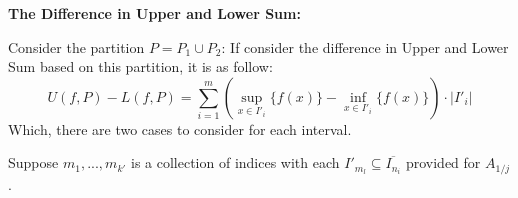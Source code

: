 \documentclass{article}
\begin{document}
\begin{itemize}
    \hfill

    \textbf{The Difference in Upper and Lower Sum:}

    Consider the partition $P=P_1\cup P_2$: If consider the difference in Upper and Lower Sum based on this partition, it is as follow:
    $$U(f,P)-L(f,P)=\sum_{i=1}^{m}\left(\sup_{x\in I'_i}\{f(x)\}-\inf_{x\in I'_i}\{f(x)\}\right)\cdot |I'_i|$$
    Which, there are two cases to consider for each interval.

    \hfill

    Suppose $m_1,...,m_{k'}$ is a collection of indices with each $I'_{m_l}\subseteq \overline{I_{n_i}}$ provided for $A_{1/j}$.


    
\end{itemize}
\end{document}
